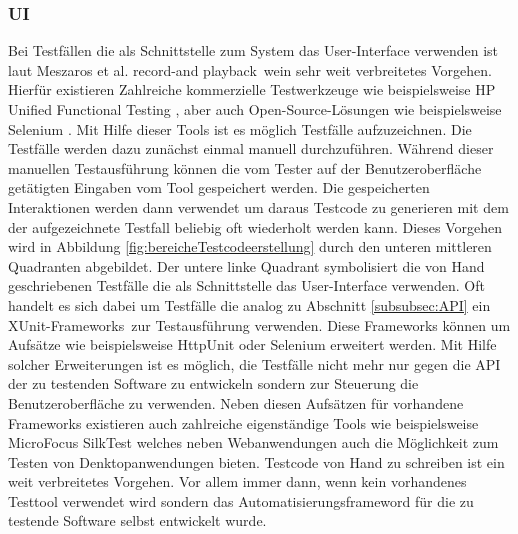 \subsubsection{UI}
\label{subsubsec:UI}
Bei Testfällen die als Schnittstelle zum System das User-Interface verwenden ist laut  Meszaros et al. \cite{meszaros_agile_2003} \grq record-and playback\grq\ wein sehr weit verbreitetes Vorgehen. Hierfür existieren Zahlreiche kommerzielle Testwerkzeuge wie beispielsweise HP Unified Functional Testing \cite{hp_testautomatisierung_2015}, aber auch Open-Source-Lösungen wie beispielsweise Selenium \cite{selenium_selenium_2015}.
Mit Hilfe dieser Tools ist es möglich Testfälle aufzuzeichnen. Die Testfälle werden dazu zunächst einmal manuell durchzuführen. Während dieser manuellen Testausführung können die vom Tester auf der Benutzeroberfläche getätigten Eingaben vom Tool gespeichert werden. Die gespeicherten Interaktionen werden dann verwendet um daraus Testcode zu generieren mit dem der aufgezeichnete Testfall beliebig oft wiederholt werden kann. Dieses Vorgehen wird in Abbildung \ref{fig:bereicheTestcodeerstellung} durch den unteren mittleren Quadranten abgebildet.
Der untere linke Quadrant symbolisiert die von Hand geschriebenen Testfälle die als Schnittstelle das User-Interface verwenden. Oft handelt es sich dabei um Testfälle die analog zu Abschnitt \ref{subsubsec:API} ein \grq XUnit-Frameworks\grq\ zur Testausführung verwenden. Diese Frameworks können um Aufsätze wie beispielsweise HttpUnit \cite{httpunit_httpunit_2015} oder Selenium \cite{selenium_selenium_2015} erweitert werden. Mit Hilfe solcher Erweiterungen ist es möglich, die Testfälle nicht mehr nur gegen die API der zu testenden Software zu entwickeln sondern zur Steuerung die Benutzeroberfläche zu verwenden. Neben diesen Aufsätzen für vorhandene Frameworks existieren auch zahlreiche eigenständige Tools wie beispielsweise MicroFocus SilkTest \cite{silk_test_borland_2015} welches neben Webanwendungen auch die Möglichkeit zum Testen von Denktopanwendungen bieten.
Testcode von Hand zu schreiben ist ein weit verbreitetes Vorgehen. Vor allem immer dann, wenn kein vorhandenes Testtool verwendet wird sondern das Automatisierungsframeword für die zu testende Software selbst entwickelt wurde.


